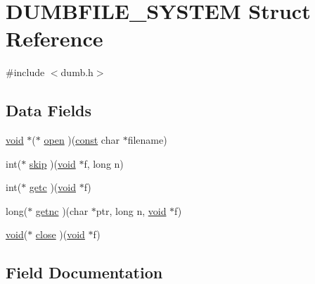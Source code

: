 \hypertarget{struct_d_u_m_b_f_i_l_e___s_y_s_t_e_m}{}\section{D\+U\+M\+B\+F\+I\+L\+E\+\_\+\+S\+Y\+S\+T\+EM Struct Reference}
\label{struct_d_u_m_b_f_i_l_e___s_y_s_t_e_m}


{\ttfamily \#include $<$dumb.\+h$>$}

\subsection*{Data Fields}
\begin{DoxyCompactItemize}
\item 
\hyperlink{png_8h_ac9c84fa68bbad002983e35ce3663c686}{void} $\ast$($\ast$ \hyperlink{struct_d_u_m_b_f_i_l_e___s_y_s_t_e_m_a95c1f4738d69d6793b7e037e2e452184}{open} )(\hyperlink{zconf_8h_a2c212835823e3c54a8ab6d95c652660e}{const} char $\ast$filename)
\item 
int($\ast$ \hyperlink{struct_d_u_m_b_f_i_l_e___s_y_s_t_e_m_a36e814a2c9926357d457dc96b28d9f15}{skip} )(\hyperlink{png_8h_ac9c84fa68bbad002983e35ce3663c686}{void} $\ast$f, long n)
\item 
int($\ast$ \hyperlink{struct_d_u_m_b_f_i_l_e___s_y_s_t_e_m_a71719f48cde302f2b017fff96f12d664}{getc} )(\hyperlink{png_8h_ac9c84fa68bbad002983e35ce3663c686}{void} $\ast$f)
\item 
long($\ast$ \hyperlink{struct_d_u_m_b_f_i_l_e___s_y_s_t_e_m_a600cd29f2454965fe6884f10269708ef}{getnc} )(char $\ast$ptr, long n, \hyperlink{png_8h_ac9c84fa68bbad002983e35ce3663c686}{void} $\ast$f)
\item 
\hyperlink{png_8h_ac9c84fa68bbad002983e35ce3663c686}{void}($\ast$ \hyperlink{struct_d_u_m_b_f_i_l_e___s_y_s_t_e_m_a786e84b39c1f201ced8a6b09f9c38bdd}{close} )(\hyperlink{png_8h_ac9c84fa68bbad002983e35ce3663c686}{void} $\ast$f)
\end{DoxyCompactItemize}


\subsection{Field Documentation}
\mbox{\label{struct_d_u_m_b_f_i_l_e___s_y_s_t_e_m_a786e84b39c1f201ced8a6b09f9c38bdd}} 
